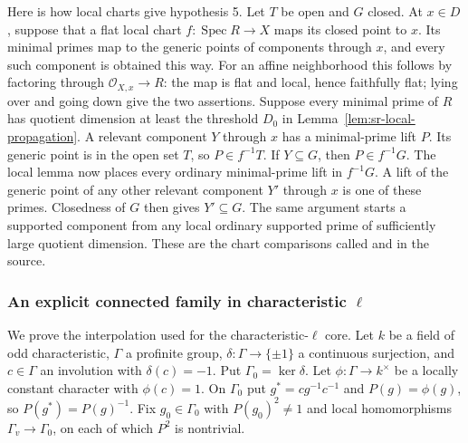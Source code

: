 Here is how local charts give hypothesis 5. Let $T$ be open and $G$
closed. At $x\in D$, suppose that a flat local chart
$f:\operatorname{Spec}R\to X$ maps its closed point to $x$.
Its minimal primes map to the generic points of components through $x$,
and every such component is obtained this way.
For an affine neighborhood this follows by factoring through
$\mathcal O_{X,x}\to R$: the map is flat and local, hence faithfully
flat; lying over and going down give the two assertions.
Suppose every minimal prime of $R$ has quotient dimension at least
the threshold $D_0$ in Lemma~\ref{lem:sr-local-propagation}.
A relevant component $Y$ through $x$ has a minimal-prime lift $P$.
Its generic point is in the open set $T$, so $P\in f^{-1}T$.
If $Y\subseteq G$, then $P\in f^{-1}G$.
The local lemma now places every ordinary minimal-prime lift in
$f^{-1}G$. A lift of the generic point of any other relevant
component $Y'$ through $x$ is one of these primes.
Closedness of $G$ then gives $Y'\subseteq G$.
The same argument starts a supported component from any local ordinary
supported prime of sufficiently large quotient dimension.
These are the chart comparisons called
 and  in the source.

\subsubsection{An explicit connected family in characteristic $\ell$}
We prove the interpolation used for the characteristic-$\ell$ core.
Let $k$ be a field of odd characteristic, $\Gamma$ a profinite group,
$\delta:\Gamma\to\{\pm1\}$ a continuous surjection, and
$c\in\Gamma$ an involution with $\delta(c)=-1$.
Put $\Gamma_0=\ker\delta$.
Let $\phi:\Gamma\to k^\times$ be a locally constant character with
$\phi(c)=1$. On $\Gamma_0$ put $g^*=cg^{-1}c^{-1}$ and
$P(g)=\phi(g)$, so $P(g^*)=P(g)^{-1}$.
Fix $g_0\in\Gamma_0$ with $P(g_0)^2\ne1$ and local homomorphisms
$\Gamma_v\to\Gamma_0$, on each of which $P^2$ is nontrivial.

